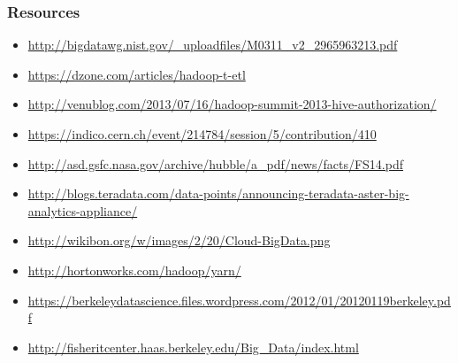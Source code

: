 \subsubsection{Resources}\label{resources-4}

\begin{itemize}
\item
  \url{http://bigdatawg.nist.gov/_uploadfiles/M0311_v2_2965963213.pdf}
\item
  \url{https://dzone.com/articles/hadoop-t-etl}
\item
  \url{http://venublog.com/2013/07/16/hadoop-summit-2013-hive-authorization/}
\item
  \url{https://indico.cern.ch/event/214784/session/5/contribution/410}
\item
  \url{http://asd.gsfc.nasa.gov/archive/hubble/a_pdf/news/facts/FS14.pdf}
\item
  \url{http://blogs.teradata.com/data-points/announcing-teradata-aster-big-analytics-appliance/}
\item
  \url{http://wikibon.org/w/images/2/20/Cloud-BigData.png}
\item
  \url{http://hortonworks.com/hadoop/yarn/}
\item
  \url{https://berkeleydatascience.files.wordpress.com/2012/01/20120119berkeley.pdf}
\item
  \url{http://fisheritcenter.haas.berkeley.edu/Big_Data/index.html}
\end{itemize}
